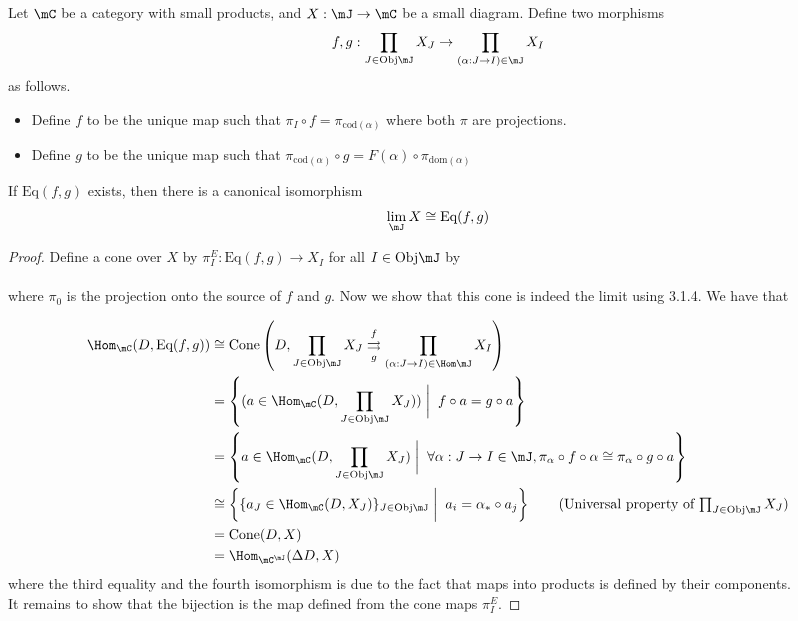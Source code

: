 \documentclass[a4paper]{article}
\begin{document}
\begin{thm}{}{} Let $\mC$ be a category with small products, and $X:\mJ\to\mC$ be a small diagram. Define two morphisms $$f,g:\prod_{J\in\text{Obj}\mJ}X_J\to\prod_{(\alpha:J\to I)\in\mJ}X_I$$ as follows. 
\begin{itemize}
\item Define $f$ to be the unique map such that $\pi_I\circ f=\pi_{\text{cod}(\alpha)}$ where both $\pi$ are projections. 
\item Define $g$ to be the unique map such that $\pi_{\text{cod}(\alpha)}\circ g=F(\alpha)\circ\pi_{\text{dom}(\alpha)}$
\end{itemize}
If $\text{Eq}(f,g)$ exists, then there is a canonical isomorphism $$\lim_\mJ X\cong\text{Eq}(f,g)$$ 
\begin{proof}
Define a cone over $X$ by $\pi_I^E:\text{Eq}(f,g)\to X_I$ for all $I\in\text{Obj}\mJ$ by \\
 \\
where $\pi_0$ is the projection onto the source of $f$ and $g$. Now we show that this cone is indeed the limit using 3.1.4. We have that 

\begin{align*}
\Hom_\mC(D,\text{Eq}(f,g))&\cong\text{Cone}\left(D,\prod_{J\in\text{Obj}\mJ}X_J\overset{f}{\underset{g}{\rightrightarrows}}\prod_{(\alpha:J\to I)\in\Hom\mJ}X_I\right)\\
&=\left\{(a\in\Hom_\mC(D,\prod_{J\in\text{Obj}\mJ}X_J))\;\bigg{|}\;\; f\circ a=g\circ a\right\}\\
&=\left\{a\in\Hom_\mC(D,\prod_{J\in\text{Obj}\mJ}X_J)\;\bigg{|}\;\;\forall\alpha:J\to I\in\mJ, \pi_\alpha\circ f\circ\alpha\cong\pi_\alpha\circ g\circ a\right\}\\
&\cong\left\{\{a_J\in\Hom_\mC(D,X_J)\}_{J\in\text{Obj}\mJ}\;\bigg{|}\;\; a_i=\alpha_\ast\circ a_j\right\}\tag{Universal property of $\prod_{J\in\text{Obj}\mJ}X_J$}\\
&=\text{Cone}(D,X)\\
&=\Hom_{\mC^\mJ}(\Delta D,X)
\end{align*}
where the third equality and the fourth isomorphism is due to the fact that maps into products is defined by their components. \\

It remains to show that the bijection is the map defined from the cone maps $\pi_I^E$. 
\end{proof}
\end{thm}
\end{document}

